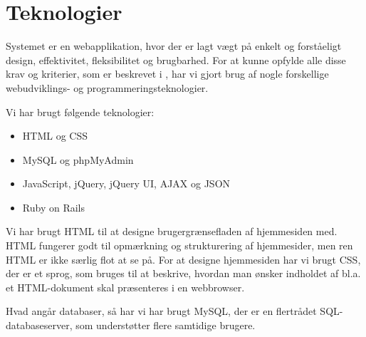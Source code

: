 \section{Teknologier}
\label{sec:teknologier}
Systemet er en webapplikation, hvor der er lagt vægt på enkelt og forståeligt design, effektivitet, fleksibilitet og brugbarhed. For at kunne opfylde alle disse krav og kriterier, som er beskrevet i , har vi gjort brug af nogle forskellige webudviklings- og programmeringsteknologier.

Vi har brugt følgende teknologier:

\begin{itemize}[noitemsep]
\item HTML og CSS
\item MySQL og phpMyAdmin
\item JavaScript, jQuery, jQuery UI, AJAX og JSON
\item Ruby on Rails
\end{itemize}

Vi har brugt HTML\cite{htmlwiki} til at designe brugergrænsefladen af hjemmesiden med. HTML fungerer godt til opmærkning og strukturering af hjemmesider, men ren HTML er ikke særlig flot at se på. For at designe hjemmesiden har vi brugt CSS\cite{csswiki}, der er et sprog, som bruges til at beskrive, hvordan man ønsker indholdet af bl.a. et HTML-dokument skal præsenteres i \fx en webbrowser.

Hvad angår databaser, så har vi har brugt MySQL\cite{mysqlwiki}, der er en flertrådet SQL-databaseserver, som understøtter flere samtidige brugere. %

